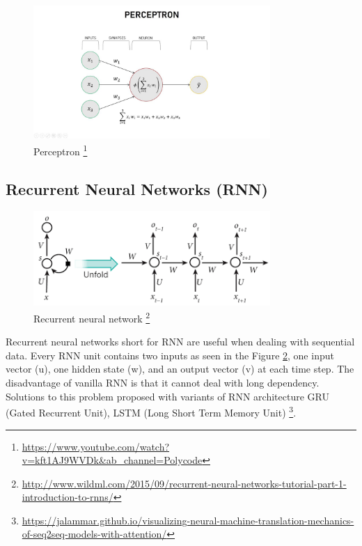 \begin{figure}[t]
            \includegraphics[width=9cm]{thesis/figures/perceptronLearningAlgo.jpg}
            \centering
            \caption{Perceptron \footnote{\url{https://www.youtube.com/watch?v=kft1AJ9WVDk&ab_channel=Polycode}}}
            \label{fig:PLA}
\end{figure}
\subsection {Recurrent Neural Networks (RNN)}
\begin{figure}[]
            \includegraphics[width=9cm]{thesis/figures/RNN.png}
            \centering
            \caption{Recurrent neural network \footnote{\url{http://www.wildml.com/2015/09/recurrent-neural-networks-tutorial-part-1-introduction-to-rnns/}}}
            \label{fig:RNN}
\end{figure}
Recurrent neural networks short for RNN \cite{mikolov2010recurrent} are useful when dealing with sequential data. Every RNN unit contains two inputs as seen in the Figure \ref{fig:RNN}, one input vector (u), one hidden state (w), and an output vector (v) at each time step. The disadvantage of vanilla RNN is that it cannot deal with long dependency. Solutions to this problem proposed with variants of RNN architecture GRU (Gated Recurrent Unit), LSTM (Long Short Term Memory Unit) \cite{mikolov2010recurrent}\footnote{\url{https://jalammar.github.io/visualizing-neural-machine-translation-mechanics-of-seq2seq-models-with-attention/}}.
